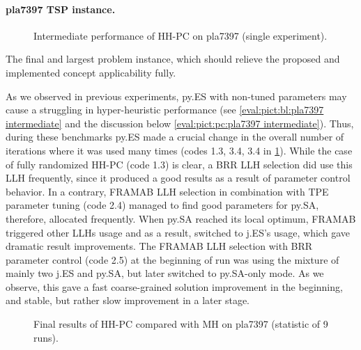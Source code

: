 \newpage
\paragraph{pla7397 TSP instance.}
\begin{figure}[t]
	\centering
	\vspace{-20pt}
	
	\caption{Intermediate performance of HH-PC on pla7397 (single experiment).}
	\vspace{-10pt}
	\label{eval:pict:hh-pc:pla7397 intermediate}
\end{figure}

The final and largest problem instance, which should relieve the proposed and implemented concept applicability fully.

As we observed in previous experiments, py.ES with non-tuned parameters may cause a struggling in hyper-heuristic performance (see \cref{eval:pict:bl:pla7397 intermediate} and the discussion below \cref{eval:pict:pc:pla7397 intermediate}). Thus, during these benchmarks py.ES made a crucial change in the overall number of iterations where it was used many times (codes 1.3, 3.4, 3.4 in \cref{eval:pict:hh-pc:pla7397 intermediate}). While the case of fully randomized HH-PC (code 1.3) is clear, a BRR LLH selection did use this LLH frequently, since it produced a good results as a result of parameter control behavior. In a contrary, FRAMAB LLH selection in combination with TPE parameter tuning (code 2.4) managed to find good parameters for py.SA, therefore, allocated frequently. When py.SA reached its local optimum, FRAMAB triggered other LLHs usage and as a result, switched to j.ES's usage, which gave dramatic result improvements. The FRAMAB LLH selection with BRR parameter control (code 2.5) at the beginning of run was using the mixture of mainly two j.ES and py.SA, but later switched to py.SA-only mode. As we observe, this gave a fast coarse-grained solution improvement in the beginning, and stable, but rather slow improvement in a later stage.

\begin{figure}[b]
	\centering
	\vspace{-20pt}
	
	\caption{Final results of HH-PC compared with MH on pla7397 (statistic of 9 runs).}
	\vspace{-5pt}
	\label{eval:pict:hh-pc:pla7397 final}
\end{figure}

